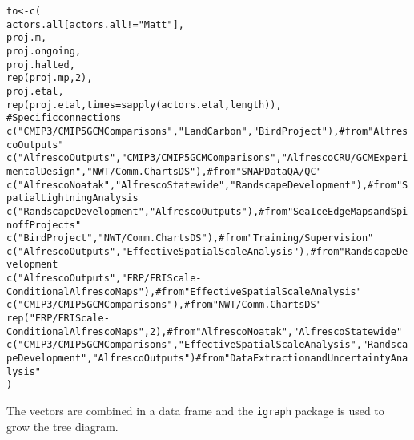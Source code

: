 \documentclass{article}\usepackage[]{graphicx}\usepackage[]{color}
\makeatletter
\newcommand{\hlnum}[1]{\textcolor[rgb]{0.863,0.196,0.184}{#1}}%
\newcommand{\hlstr}[1]{\textcolor[rgb]{0.863,0.196,0.184}{#1}}%
\newcommand{\hlcom}[1]{\textcolor[rgb]{0.345,0.431,0.459}{#1}}%
\newcommand{\hlopt}[1]{\textcolor[rgb]{0.576,0.631,0.631}{#1}}%
\newcommand{\hlstd}[1]{\textcolor[rgb]{0.514,0.58,0.588}{#1}}%
\newcommand{\hlkwb}[1]{\textcolor[rgb]{0.522,0.6,0}{#1}}%
\newcommand{\hlkwc}[1]{\textcolor[rgb]{0.796,0.294,0.086}{#1}}%
\newcommand{\hlkwd}[1]{\textcolor[rgb]{0.576,0.631,0.631}{#1}}%
\newenvironment{kframe}{%
 \def\at@end@of@kframe{}%
 \ifinner\ifhmode%
  \def\at@end@of@kframe{\end{minipage}}%
  \begin{minipage}{\columnwidth}%
 \fi\fi%
 \def\FrameCommand##1{\hskip\@totalleftmargin \hskip-\fboxsep
 \colorbox{shadecolor}{##1}\hskip-\fboxsep
     \hskip-\linewidth \hskip-\@totalleftmargin \hskip\columnwidth}%
 \MakeFramed {\advance\hsize-\width
   \@totalleftmargin\z@ \linewidth\hsize
   \@setminipage}}%
 {\par\unskip\endMakeFramed%
 \at@end@of@kframe}
\newenvironment{knitrout}{}{} %
\makeatother
\begin{document}
\begin{knitrout}
\begin{kframe}
\begin{alltt}
\hlstd{to} \hlkwb{<-} \hlkwd{c}\hlstd{(}
        \hlstd{actors.all[actors.all}\hlopt{!=}\hlstr{"Matt"}\hlstd{],}
        \hlstd{proj.m,}
        \hlstd{proj.ongoing,}
        \hlstd{proj.halted,}
        \hlkwd{rep}\hlstd{(proj.mp,} \hlnum{2}\hlstd{),}
        \hlstd{proj.etal,}
        \hlkwd{rep}\hlstd{(proj.etal,} \hlkwc{times}\hlstd{=}\hlkwd{sapply}\hlstd{(actors.etal, length)),}
        \hlcom{# Specific connections}
        \hlkwd{c}\hlstd{(}\hlstr{"CMIP3/CMIP5 GCM Comparisons"}\hlstd{,} \hlstr{"Land Carbon"}\hlstd{,} \hlstr{"Bird Project"}\hlstd{),} \hlcom{# from "Alfresco Outputs"}
        \hlkwd{c}\hlstd{(}\hlstr{"Alfresco Outputs"}\hlstd{,} \hlstr{"CMIP3/CMIP5 GCM Comparisons"}\hlstd{,} \hlstr{"Alfresco CRU/GCM Experimental Design"}\hlstd{,} \hlstr{"NWT/Comm. Charts DS"}\hlstd{),} \hlcom{# from "SNAP Data QA/QC"}
        \hlkwd{c}\hlstd{(}\hlstr{"Alfresco Noatak"}\hlstd{,} \hlstr{"Alfresco Statewide"}\hlstd{,} \hlstr{"Randscape Development"}\hlstd{),} \hlcom{# from "Spatial Lightning Analysis}
        \hlkwd{c}\hlstd{(}\hlstr{"Randscape Development"}\hlstd{,} \hlstr{"Alfresco Outputs"}\hlstd{),} \hlcom{# from "Sea Ice Edge Maps and Spinoff Projects"}
        \hlkwd{c}\hlstd{(}\hlstr{"Bird Project"}\hlstd{,} \hlstr{"NWT/Comm. Charts DS"}\hlstd{),} \hlcom{# from "Training/Supervision"}
        \hlkwd{c}\hlstd{(}\hlstr{"Alfresco Outputs"}\hlstd{,} \hlstr{"Effective Spatial Scale Analysis"}\hlstd{),} \hlcom{# from "Randscape Development}
        \hlkwd{c}\hlstd{(}\hlstr{"Alfresco Outputs"}\hlstd{,} \hlstr{"FRP/FRI Scale-Conditional Alfresco Maps"}\hlstd{),} \hlcom{# from "Effective Spatial Scale Analysis"}
        \hlkwd{c}\hlstd{(}\hlstr{"CMIP3/CMIP5 GCM Comparisons"}\hlstd{),} \hlcom{#from "NWT/Comm. Charts DS"}
        \hlkwd{rep}\hlstd{(}\hlstr{"FRP/FRI Scale-Conditional Alfresco Maps"}\hlstd{,} \hlnum{2}\hlstd{),} \hlcom{# from "Alfresco Noatak", "Alfresco Statewide"}
        \hlkwd{c}\hlstd{(}\hlstr{"CMIP3/CMIP5 GCM Comparisons"}\hlstd{,} \hlstr{"Effective Spatial Scale Analysis"}\hlstd{,} \hlstr{"Randscape Development"}\hlstd{,} \hlstr{"Alfresco Outputs"}\hlstd{)} \hlcom{# from "Data Extraction and Uncertainty Analysis"}
\hlstd{)}
\end{alltt}
\end{kframe}
\end{knitrout}

The vectors are combined in a data frame and the \texttt{igraph} package is used to grow the tree diagram.
\end{document}
